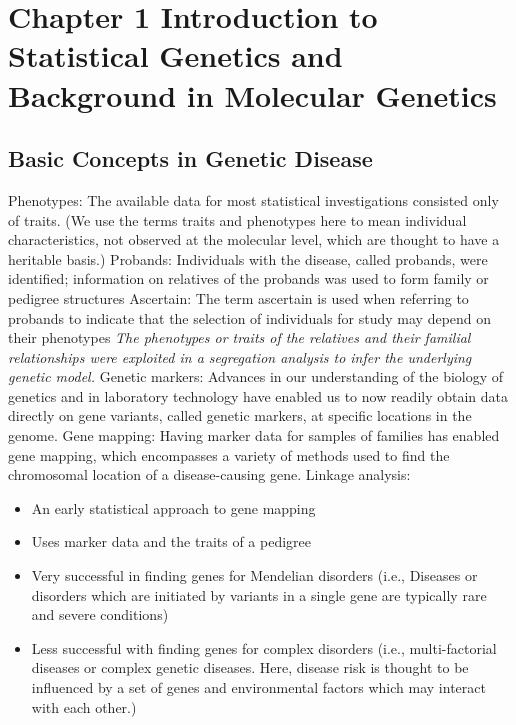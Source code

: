 \documentclass[a4paper,twoside,11pt]{article}
\begin{document}
\tableofcontents
\newpage
\section{Chapter 1 Introduction to Statistical Genetics and Background in Molecular Genetics}
\subsection{Basic Concepts in Genetic Disease}
\textcolor{NavyBlue}{Phenotypes: }The available data for most statistical investigations consisted only of traits. (We use the terms traits and phenotypes here to mean individual characteristics, not observed at the molecular level, which are thought to have a heritable basis.)
\newline
\newline
\textcolor{NavyBlue}{Probands: }Individuals with the disease, called probands, were identified; information on relatives of the probands was used to form family or pedigree structures
\newline
\newline
\textcolor{NavyBlue}{Ascertain: }The term ascertain is used when referring to probands to indicate that the selection of individuals for study may depend on their phenotypes
\newline
\newline
\textcolor{NavyBlue}{\textit{The phenotypes or traits of the relatives and their familial relationships were exploited in a segregation analysis to infer the underlying genetic model.}}
\newline
\newline
\textcolor{NavyBlue}{Genetic markers: }Advances in our understanding of the biology of genetics and in laboratory technology have enabled us to now readily obtain data directly on gene variants, called genetic markers, at specific locations in the genome.
\newline
\newline
\textcolor{NavyBlue}{Gene mapping: }Having marker data for samples of families has enabled gene mapping, which encompasses a variety of methods used to find the chromosomal location of a disease-causing gene.
\newline
\newline
\textcolor{NavyBlue}{Linkage analysis: }
\begin{itemize}
    \item An early statistical approach to gene mapping
    \item Uses marker data and the traits of a pedigree
    \item Very successful in finding genes for Mendelian disorders (i.e., Diseases or disorders which are initiated by variants in a single gene are typically rare and severe conditions)
    \item Less successful with finding genes for complex disorders (i.e., multi-factorial diseases or complex genetic diseases. Here, disease risk is thought to be influenced by a set of genes and environmental factors which may interact with each other.)
\end{itemize}
\end{document}
